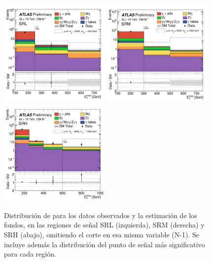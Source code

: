 \begin{figure}[!hb]
   \centering
   \includegraphics[width=0.48\textwidth]{images/results/fr2_unblind/sigReg_SRL_fr2_met_et_v2.pdf}
   \includegraphics[width=0.48\textwidth]{images/results/fr2_unblind/sigReg_SRM_fr2_met_et_v2.pdf}
   \includegraphics[width=0.48\textwidth]{images/results/fr2_unblind/sigReg_SRH_fr2_met_et_v2.pdf}
   \caption{Distribución de \met para los datos observados y la estimación de los fondos, en las regiones de señal SRL (izquierda), SRM (derecha) y SRH (abajo), omitiendo el corte en esa misma variable (N-1). Se incluye además la distribución del punto de señal más significativo para cada región.}
   \label{fig:met_n-1_SRL_SRM_SRH_fr2}
\end{figure}


